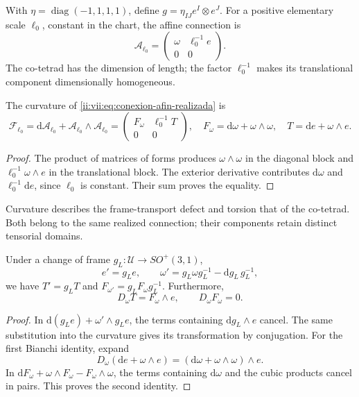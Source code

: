 With \(\eta=\operatorname{diag}(-1,1,1,1)\), define
\(g=\eta_{IJ}e^I\otimes e^J\). For a positive elementary scale
\(\ell_0\), constant in the chart, the affine connection is
\begin{equation}
 \mathcal A_{\ell_0}
 =\begin{pmatrix}\omega&\ell_0^{-1}e\\0&0\end{pmatrix}.
 \label{ii:vii:eq:conexion-afin-realizada}
\end{equation}
The co-tetrad has the dimension of length; the factor
\(\ell_0^{-1}\) makes its translational component dimensionally homogeneous.

\begin{proposition}
\label{ii:vii:prop:curvatura-afin}
The curvature of \eqref{ii:vii:eq:conexion-afin-realizada} is
\begin{equation}
 \mathcal F_{\ell_0}
 =\mathrm d\mathcal A_{\ell_0}
   +\mathcal A_{\ell_0}\wedge\mathcal A_{\ell_0}
 =\begin{pmatrix}F_\omega&\ell_0^{-1}T\\0&0\end{pmatrix},
 \quad F_\omega=\mathrm d\omega+\omega\wedge\omega,
 \quad T=\mathrm de+\omega\wedge e.
 \label{ii:vii:eq:curvatura-afin-realizada}
\end{equation}
\end{proposition}
\begin{proof}
The product of matrices of forms produces
\(\omega\wedge\omega\) in the diagonal block and
\(\ell_0^{-1}\omega\wedge e\) in the translational block.
The exterior derivative contributes
\(\mathrm d\omega\) and \(\ell_0^{-1}\mathrm de\), since
\(\ell_0\) is constant. Their sum proves the equality.
\end{proof}

Curvature describes the frame-transport defect and torsion
that of the co-tetrad. Both belong to the same realized connection;
their components retain distinct tensorial domains.

\begin{proposition}
\label{ii:vii:prop:bianchi-cartan}
Under a change of frame \(g_L:\mathcal U\to SO^+(3,1)\),
\[
 e'=g_Le,\qquad
 \omega'=g_L\omega g_L^{-1}-\mathrm dg_L\,g_L^{-1},
\]
we have \(T'=g_LT\) and \(F_{\omega'}=g_LF_\omega g_L^{-1}\).
Furthermore,
\begin{equation}
 D_\omega T=F_\omega\wedge e,\qquad D_\omega F_\omega=0.
 \label{ii:vii:eq:bianchi-realizacion}
\end{equation}
\end{proposition}
\begin{proof}
In \(\mathrm d(g_Le)+\omega'\wedge g_Le\), the terms
containing \(\mathrm dg_L\wedge e\) cancel.
The same substitution into the curvature gives its transformation by
conjugation. For the first Bianchi identity, expand
\[
 D_\omega(\mathrm de+\omega\wedge e)
 =(\mathrm d\omega+\omega\wedge\omega)\wedge e.
\]
In \(\mathrm dF_\omega+\omega\wedge F_\omega-F_\omega\wedge\omega\),
the terms containing \(\mathrm d\omega\) and the cubic
products cancel in pairs. This proves the second identity.
\end{proof}

